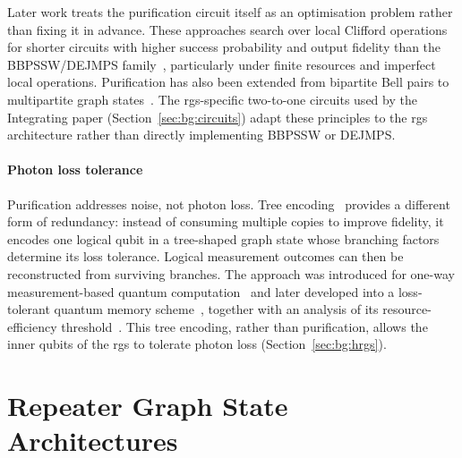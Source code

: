 Later work treats the purification circuit itself as an optimisation problem rather than fixing it in advance. These approaches search over local Clifford operations for shorter circuits with higher success probability and output fidelity than the BBPSSW/DEJMPS family~\cite{Krastanov2019Optimized}, particularly under finite resources and imperfect local operations. Purification has also been extended from bipartite Bell pairs to multipartite graph states~\cite{Dur2003Multiparticle,Kruszynska2006Entanglement}. The \Gls{rgs}-specific two-to-one circuits used by the Integrating paper (Section~\ref{sec:bg:circuits}) adapt these principles to the \Gls{rgs} architecture rather than directly implementing BBPSSW or DEJMPS.

\paragraph{Photon loss tolerance} Purification addresses noise, not photon loss. Tree encoding~\cite{Varnava2006Loss} provides a different form of redundancy: instead of consuming multiple copies to improve fidelity, it encodes one logical qubit in a tree-shaped graph state whose branching factors determine its loss tolerance. Logical measurement outcomes can then be reconstructed from surviving branches. The approach was introduced for one-way measurement-based quantum computation~\cite{Raussendorf2003Measurementbased,Raussendorf2002oneway,Varnava2006Loss} and later developed into a loss-tolerant quantum memory scheme~\cite{Varnava2007Loss}, together with an analysis of its resource-efficiency threshold~\cite{Varnava2008How}. This tree encoding, rather than purification, allows the inner qubits of the \Gls{rgs} to tolerate photon loss (Section~\ref{sec:bg:hrgs}).

\section{Repeater Graph State Architectures}
\label{sec:rw:rgs}

